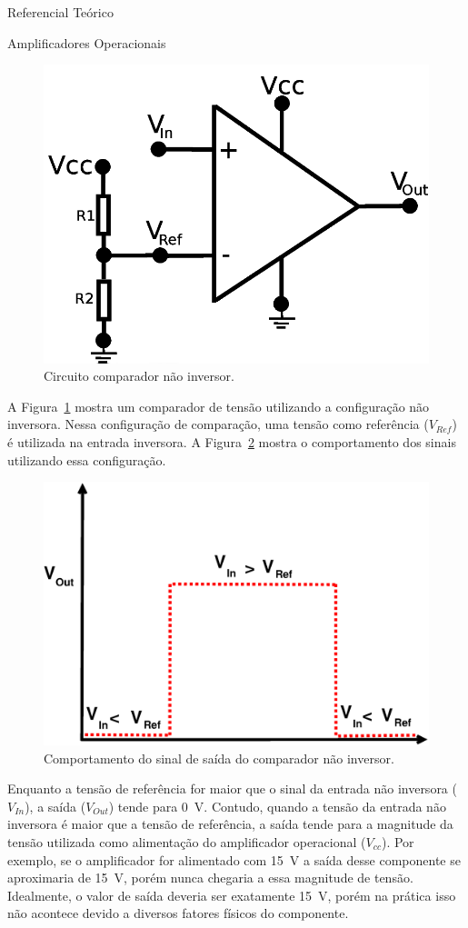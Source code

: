 \begin{chapter}{Referencial Teórico}
\begin{section}{Amplificadores Operacionais}
\begin{figure}[!h]
	\centering
	\begin{minipage}[c]{\textwidth}
	\centering
	\includegraphics[width=0.55\linewidth]{fig/nao_inversor}
	\caption{Circuito comparador não inversor.}
	\label{fig:comparador1}
	\end{minipage}
\end{figure}

A Figura~\ref{fig:comparador1} mostra um comparador de tensão utilizando a
configuração não inversora. Nessa configuração de comparação, uma tensão como
referência ($V_{Ref}$) é utilizada na entrada inversora. A
Figura~\ref{fig:sinal1} mostra o comportamento dos sinais utilizando essa
configuração.

\begin{figure}[!h]
	\centering
	\begin{minipage}[c]{\textwidth}
	\centering
	\includegraphics[width=0.55\linewidth]{fig/comparador_nao_inversor}
	\caption{Comportamento do sinal de saída do comparador não inversor.}
	\label{fig:sinal1}
	\end{minipage}
\end{figure}

Enquanto a tensão de referência for maior que o sinal da entrada não inversora
($V_{In}$), a saída ($V_{Out}$) tende para 0~V. Contudo, quando a tensão da
entrada não inversora é maior que a tensão de referência, a saída  tende para a
magnitude da tensão utilizada como alimentação do amplificador operacional
($V_{cc}$). Por exemplo, se o amplificador for alimentado com 15~V a saída desse
componente se aproximaria de 15~V, porém nunca chegaria a essa magnitude de
tensão. Idealmente, o valor de saída deveria ser exatamente 15~V, porém na
prática isso não acontece devido a diversos fatores físicos do componente.


\end{section}
\end{chapter}
